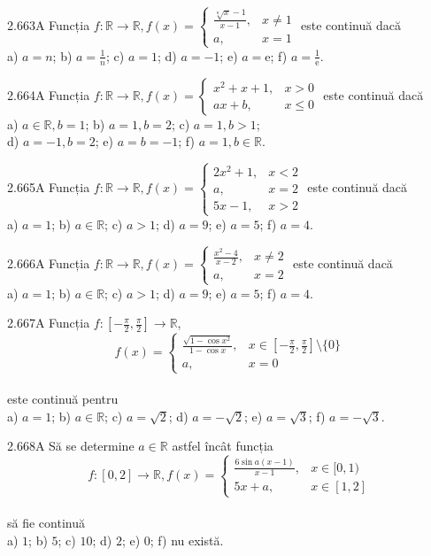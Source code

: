 \documentclass[11pt]{article}
\begin{document}
2.663A Funcția $f: \mathbb{R} \rightarrow \mathbb{R}, f(x)=\left\{\begin{array}{ll}\frac{\sqrt[n]{x}-1}{x-1}, & x \neq 1 \\ a, & x=1\end{array}\right.$ este continuă dacă\\ a) $a=n$; b) $a=\frac{1}{n}$; c) $a=1$; d) $a=-1$; e) $a=\mathrm{e}$; f) $a=\frac{1}{\mathrm{e}}$.

2.664A Funcția $f: \mathbb{R} \rightarrow \mathbb{R}, f(x)= \begin{cases}x^{2}+x+1, & x>0 \\ a x+b, & x \leq 0\end{cases}$ este continuă dacă\\ a) $a \in \mathbb{R}, b=1$; b) $a=1, b=2$; c) $a=1, b>1$;\\ d) $a=-1, b=2$; e) $a=b=-1$; f) $a=1, b \in \mathbb{R}$.

2.665A Funcția $f: \mathbb{R} \rightarrow \mathbb{R}, f(x)=\left\{\begin{array}{ll}2 x^{2}+1, & x<2 \\ a, & x=2 \\ 5 x-1, & x>2\end{array}\right.$ este continuă dacă\\ a) $a=1$; b) $a \in \mathbb{R}$; c) $a>1$; d) $a=9$; e) $a=5$; f) $a=4$.

2.666A Funcția $f: \mathbb{R} \rightarrow \mathbb{R}, f(x)=\left\{\begin{array}{ll}\frac{x^{2}-4}{x-2}, & x \neq 2 \\ a, & x=2\end{array}\right.$ este continuă dacă\\ a) $a=1$; b) $a \in \mathbb{R}$; c) $a>1$; d) $a=9$; e) $a=5$; f) $a=4$.

2.667A Funcția $f:\left[-\frac{\pi}{2}, \frac{\pi}{2}\right] \rightarrow \mathbb{R}$, $$f(x)= \begin{cases}\frac{\sqrt{1-\cos x^{2}}}{1-\cos x}, & x \in\left[-\frac{\pi}{2}, \frac{\pi}{2}\right] \setminus\{0\} \\ a, & x=0\end{cases}$$\\este continuă pentru\\ a) $a=1$; b) $a \in \mathbb{R}$; c) $a=\sqrt{2}$; d) $a=-\sqrt{2}$; e) $a=\sqrt{3}$; f) $a=-\sqrt{3}$.

2.668A Să se determine $a \in \mathbb{R}$ astfel încât funcția $$f:[0,2] \rightarrow \mathbb{R}, f(x)= \begin{cases}\frac{6 \sin a(x-1)}{x-1}, & x \in[0,1) \\ 5 x+a, & x \in[1,2]\end{cases}$$\\să fie continuă\\ a) $1$; b) $5$; c) $10$; d) $2$; e) $0$; f) nu există.
\end{document}
